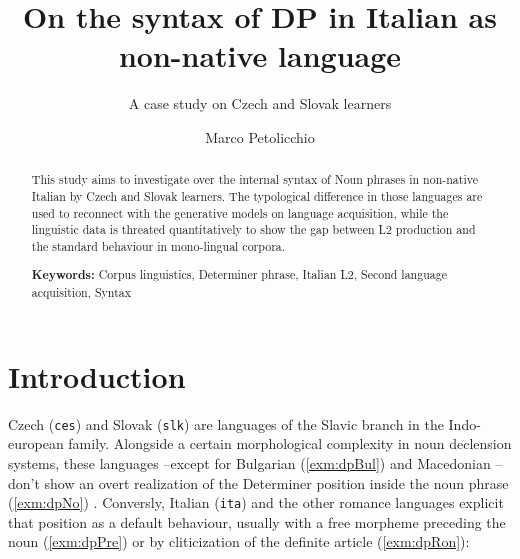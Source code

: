 \documentclass[
  a4paper,
  twoside,
  12pt,
  chapterprefix=false,
  listof=flat]{scrartcl}
\title{On the syntax of DP in Italian as non-native language}
\subtitle{A case study on Czech and Slovak learners}
\author{Marco Petolicchio}
\date{}
\theoremstyle{plain} %
\theoremstyle{definition}
\theoremstyle{remark}
\begin{document}
\maketitle
\begin{abstract}
This study aims to investigate over the internal syntax of Noun phrases in non-native Italian by Czech and Slovak learners. The typological difference in those languages are used to reconnect with the generative models on language acquisition, while the linguistic data is threated quantitatively to show the gap between L2 production and the standard behaviour in mono-lingual corpora.

\par

\textbf{Keywords:} Corpus linguistics, Determiner phrase, Italian L2, Second language acquisition, Syntax
\end{abstract}

{
\setcounter{tocdepth}{2}
\tableofcontents
}
\clearpage

\hypertarget{introduction}{%
\section{Introduction}\label{introduction}}

Czech (\texttt{ces}) and Slovak (\texttt{slk}) are languages of the Slavic branch in the Indo-european family. Alongside a certain morphological complexity in noun declension systems, these languages --except for Bulgarian (\ref{exm:dpBul}) and Macedonian \citep{wals-37}-- don't show an overt realization of the Determiner position inside the noun phrase (\ref{exm:dpNo}) \citep{harkins1953}.
Conversly, Italian (\texttt{ita}) and the other romance languages explicit that position as a default behaviour, usually with a free morpheme preceding the noun (\ref{exm:dpPre}) or by cliticization of the definite article (\ref{exm:dpRon}):
\end{document}
